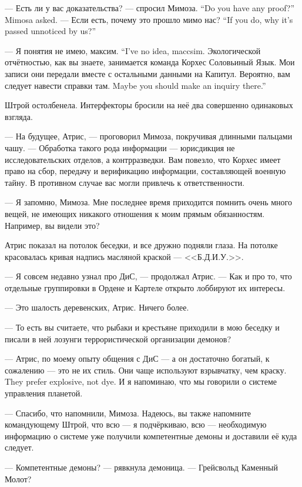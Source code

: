 {--- Есть ли у вас доказательства? --- спросил Мимоза.}
{``Do you have any proof?'' Mimosa asked.}
{--- Если есть, почему это прошло мимо нас?}
{``If you do, why it's passed unnoticed by us?''}

{--- Я понятия не имею, максим.}
{``I've no idea, maccsim.}
Экологической отчётностью, как вы знаете, занимается команда Корхес Соловьиный Язык.
Мои записи они передали вместе с остальными данными на Капитул.
{Вероятно, вам следует навести справки там.}
{Maybe you should make an inquiry there.''}

Штрой остолбенела.
Интерфекторы бросили на неё два совершенно одинаковых взгляда.

--- На будущее, Атрис, --- проговорил Мимоза, покручивая длинными пальцами чашу.
--- Обработка такого рода информации --- юрисдикция не исследовательских отделов, а контрразведки.
Вам повезло, что Корхес имеет право на сбор, передачу и верификацию информации, составляющей военную тайну.
В противном случае вас могли привлечь к ответственности.

--- Я запомню, Мимоза.
Мне последнее время приходится помнить очень много вещей, не имеющих никакого отношения к моим прямым обязанностям.
Например, вы видели это?

Атрис показал на потолок беседки, и все дружно подняли глаза.
На потолке красовалась кривая надпись масляной краской --- <<Б.Д.И.У.>>.

--- Я совсем недавно узнал про ДиС, --- продолжал Атрис.
--- Как и про то, что отдельные группировки в Ордене и Картеле открыто лоббируют их интересы.

--- Это шалость деревенских, Атрис.
Ничего более.

--- То есть вы считаете, что рыбаки и крестьяне приходили в мою беседку и писали в ней лозунги террористической организации демонов?

--- Атрис, по моему опыту общения с ДиС --- а он достаточно богатый, к сожалению --- это не их стиль.
{Они чаще используют взрывчатку, чем краску.}
{They prefer explosive, not dye.}
И я напоминаю, что мы говорили о системе управления планетой.

--- Спасибо, что напомнили, Мимоза.
Надеюсь, вы также напомните командующему Штрой, что всю --- я подчёркиваю, всю --- необходимую информацию о системе уже получили компетентные демоны и доставили её куда следует.

--- Компетентные демоны? --- рявкнула демоница.
--- Грейсвольд Каменный Молот?

